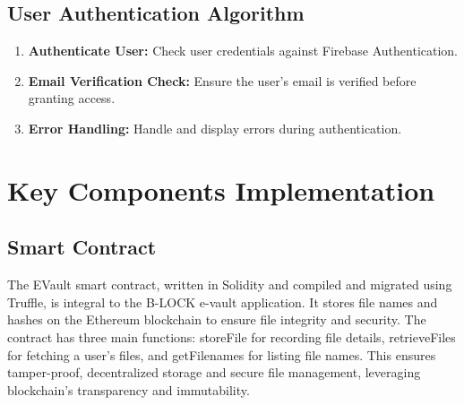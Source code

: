 \documentclass[12pt,a4paper]{report}
\begin{document}
\subsection{User Authentication Algorithm}
\begin{enumerate}
   \item \textbf{Authenticate User:} Check user credentials against Firebase Authentication.
   \item \textbf{Email Verification Check:} Ensure the user’s email is verified before granting access.
   \item \textbf{Error Handling:} Handle and display errors during authentication.
\end{enumerate}


\section{Key Components Implementation}
\subsection{Smart Contract}
The EVault smart contract\cite{antonopoulos2018mastering}, written in Solidity and compiled and migrated using Truffle\cite{truffledocs}, is integral to the B-LOCK e-vault application. It stores file names and hashes on the Ethereum blockchain to ensure file integrity and security. The contract has three main functions: storeFile for recording file details, retrieveFiles for fetching a user's files, and getFilenames for listing file names. This ensures tamper-proof, decentralized storage and secure file management, leveraging blockchain's transparency and immutability.


\end{document}
